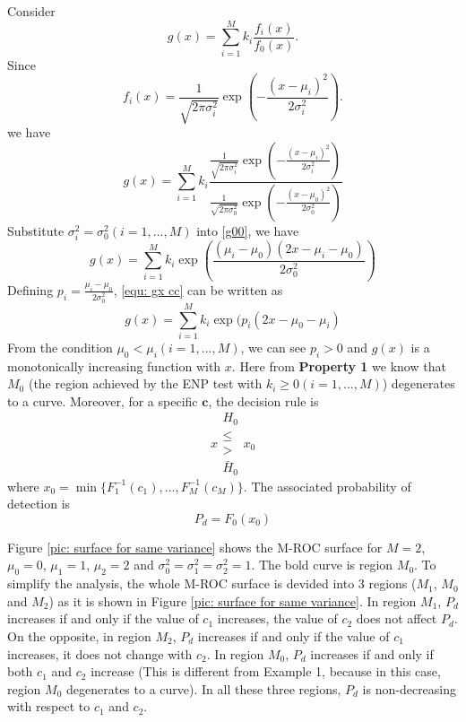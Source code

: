 Consider
\begin{equation}
\label{equ: define gx}
g(x) = \sum_{i=1}^{M}k_i\frac{f_i(x)}{f_0(x)}.
\end{equation}
Since 
\begin{equation}
\label{equ: gaussian PDF}
f_i(x) = \frac{1}{\sqrt{2\pi\sigma_i^2}}\exp(-\frac{(x-\mu_i)^2}{2\sigma_i^2}).
\end{equation}
we have
\begin{equation}
\label{g00}
g(x) = \sum_{i=1}^{M}k_i\frac{\frac{1}{\sqrt{2\pi\sigma_i^2}}\exp(-\frac{(x-\mu_i)^2}{2\sigma_i^2})}{\frac{1}{\sqrt{2\pi\sigma_0^2}}\exp(-\frac{(x-\mu_0)^2}{2\sigma_0^2})}
\end{equation}
Substitute  $\sigma_i^2 = \sigma_0^2 (i = 1, ..., M)$ into \eqref{g00}, we have 
\begin{equation}
\label{equ: gx cc}
g(x) = \sum_{i=1}^{M}k_i\exp(\frac{(\mu_i - \mu_0)(2x-\mu_i - \mu_0)}{2\sigma_0^2})
\end{equation}
Defining $p_i = \frac{\mu_i - \mu_0}{2\sigma_0^2}$, \eqref{equ: gx cc} can be written as
\begin{equation}
g(x) = \sum_{i=1}^{M}k_i\exp(p_i(2x-\mu_0 - \mu_i)
\end{equation}
From the condition $\mu_0 < \mu_i (i=1, ..., M)$, we can see $p_i >0$ and  $g(x)$ is a monotonically increasing function with $x$. Here from \textbf{Property 1} we know that $M_0$ (the region achieved by the ENP test with $k_i \geq 0 (i=1, ..., M)$) degenerates to a curve. Moreover, for a specific $\mathbf{c}$, the decision rule is 
\[
x \substack{H_0 \\ \leq \\ > \\ \bar{H}_0} x_0
\]
where $x_0 = \min\{F_1^{-1}(c_1), ..., F_M^{-1}(c_M)\}$. The associated probability of detection is
\[
P_d = F_0(x_0)
\]

Figure \ref{pic: surface for same variance} shows the M-ROC surface for $M=2$, $\mu_0 = 0$, $\mu_1 = 1$, $\mu_2 = 2$ and $\sigma_0^2 = \sigma_1^2 = \sigma_2^2 = 1$. The bold curve is region $M_0$.
To simplify the analysis, the whole M-ROC surface is devided into 3 regions ($M_1$, $M_0$ and $M_2$) as it is shown in Figure \ref{pic: surface for same variance}.  In region $M_1$, $P_d$ increases if and only if the value of $c_1$ increases, the value of $c_2$ does not affect $P_d$. On the opposite, in region $M_2$, $P_d$ increases if and only if the value of $c_1$ increases, it does not change with $c_2$. In region $M_0$, $P_d$ increases if and only if both $c_1$ and $c_2$ increase (This is different from Example 1, because in this case, region $M_0$ degenerates to a curve). 
In all these three regions, $P_d$ is non-decreasing with respect to $c_1$ and $c_2$. 

